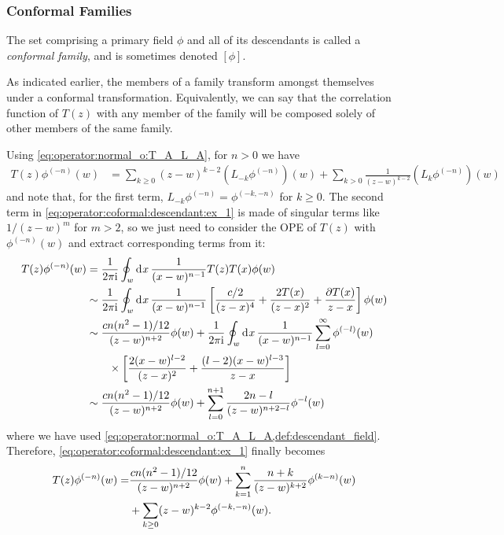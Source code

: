 \documentclass[10pt]{article}
\newcommand{\ii}{\mathrm{i}}
\begin{document}
\subsubsection{Conformal Families}
\begin{definition}
    The set comprising a primary field $\phi$ and all of its descendants is called a \textit{conformal family}, and is sometimes denoted $[\phi]$.
\end{definition}
As indicated earlier, the members of a family transform amongst themselves under a conformal transformation.
Equivalently, we can say that the correlation function of $T(z)$ with any member of the family will be composed solely of other members of the same family.
\begin{example}
    Using \cref{eq:operator:normal_o:T_A_L_A}, for $n>0$ we have 
    \begin{align}\label{eq:operator:coformal:descendant:ex_1}
        T(z)\phi^{(-n)}(w) & =\sum_{k\geq0}(z-w)^{k-2}\left(L_{-k}\phi^{(-n)}\right)(w)+\sum_{k>0}\frac{1}{(z-w)^{k-2}}\left(L_{k}\phi^{(-n)}\right)(w)
    \end{align}
    and note that, for the first term, $L_{-k}\phi^{(-n)}=\phi^{(-k,-n)}$ for $k\geq0$.
    The second term in \cref{eq:operator:coformal:descendant:ex_1} is made of singular terms like $1/(z-w)^m$ for $m>2$, so we just need to consider the OPE of $T(z)$ with $\phi^{(-n)}(w)$ and extract corresponding terms from it:
    \begin{align}
        T(z)\phi^{(-n)}(w) & =\frac{1}{2\pi\ii}\oint_w\dd[]{x}\frac{1}{(x-w)^{n-1}}T(z)T(x)\phi(w)\notag                                                                            \\
                           & \sim\frac{1}{2\pi\ii}\oint_w\dd[]{x}\frac{1}{(x-w)^{n-1}}\left[\frac{c/2}{(z-x)^4}+\frac{2T(x)}{(z-x)^2}+\frac{\partial T(x)}{z-x}\right]\phi(w)\notag \\
                           & \sim\frac{cn(n^2-1)/12}{(z-w)^{n+2}}\phi(w)+\frac{1}{2\pi\ii}\oint_w\dd[]{x}\frac{1}{(x-w)^{n-1}}\sum_{l=0}^\infty\phi^{(-l)}(w)\notag                 \\
                           & \quad\quad\times\left[\frac{2(x-w)^{l-2}}{(z-x)^2}+\frac{(l-2)(x-w)^{l-3}}{z-x}\right]\notag                                                           \\
                           & \sim\frac{cn(n^2-1)/12}{(z-w)^{n+2}}\phi(w)+\sum_{l=0}^{n+1}\frac{2n-l}{(z-w)^{n+2-l}}\phi^{-l}(w)
    \end{align}
    where we have used \cref{eq:operator:normal_o:T_A_L_A,def:descendant_field}.
    Therefore, \cref{eq:operator:coformal:descendant:ex_1} finally becomes 
    \begin{align}
        T(z)\phi^{(-n)}(w)= & \frac{cn(n^2-1)/12}{(z-w)^{n+2}}\phi(w)+\sum_{k=1}^{n}\frac{n+k}{(z-w)^{k+2}}\phi^{(k-n)}(w)\notag \\
                            & +\sum_{k\geq0}(z-w)^{k-2}\phi^{(-k,-n)}(w).
    \end{align}
\end{example}
\end{document}
